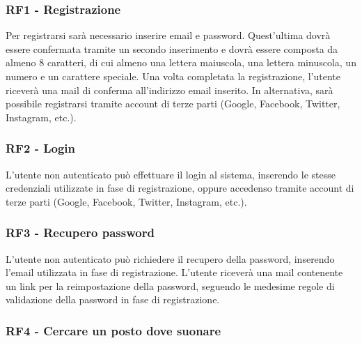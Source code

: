 \documentclass[12pt, a4paper]{article}
\begin{document}
\subsubsection*{\hypertarget{RF1}{RF1 - Registrazione}}

Per registrarsi sarà necessario inserire email e password.
Quest'ultima dovrà essere confermata tramite un secondo inserimento e dovrà essere composta da almeno 8 caratteri, di cui almeno una lettera maiuscola, una lettera minuscola, un numero e un carattere speciale. Una volta completata la registrazione, l'utente riceverà una mail di conferma all'indirizzo email inserito. In alternativa, sarà possibile registrarsi tramite account di terze parti (Google, Facebook, Twitter, Instagram, etc.).



\subsubsection*{\hypertarget{RF2}{RF2 - Login}}

L'utente non autenticato può effettuare il login al sistema, inserendo le stesse credenziali utilizzate in fase di registrazione, oppure accedenso tramite account di terze parti (Google, Facebook, Twitter, Instagram, etc.).

\subsubsection*{\hypertarget{RF3}{RF3 - Recupero password}}

L'utente non autenticato può richiedere il recupero della password, inserendo l'email utilizzata in fase di registrazione. L'utente riceverà una mail contenente un link per la reimpostazione della password, seguendo le medesime regole di validazione della password in fase di registrazione.

\subsubsection*{\hypertarget{RF4}{RF4 - Cercare un posto dove suonare}}
\end{document}
